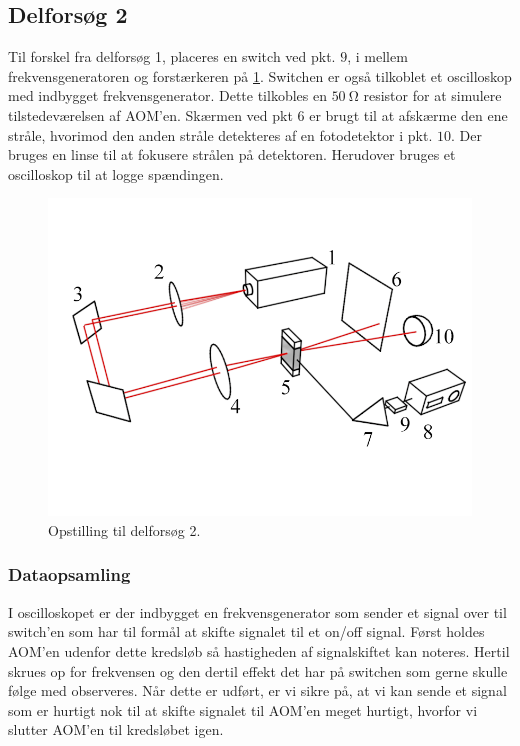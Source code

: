 \documentclass[main]{subfiles}
\begin{document}
\subsection{Delforsøg 2}\label{dataopsamling2}
Til forskel fra delforsøg 1, placeres en switch ved pkt. $9$, i mellem frekvensgeneratoren og forstærkeren på \cref{fig:opstilling2}. Switchen er også tilkoblet et oscilloskop med indbygget frekvensgenerator. Dette tilkobles en $\SI{50}{\ohm}$ resistor for at simulere tilstedeværelsen af AOM'en. Skærmen ved pkt $6$ er brugt til at afskærme den ene stråle, hvorimod den anden stråle detekteres af en fotodetektor i pkt. $10$. Der bruges en linse til at fokusere strålen på detektoren. Herudover bruges et oscilloskop til at logge spændingen.

\begin{figure}[H]
    \centering
    \includegraphics[width=\linewidth]{tegninger/tegning2.png}
    \caption{Opstilling til delforsøg 2.}
    \label{fig:opstilling2}
\end{figure}

\subsubsection{Dataopsamling}
I oscilloskopet er der indbygget en frekvensgenerator som sender et signal over til switch'en som har til formål at skifte signalet til et on/off signal. Først holdes AOM'en udenfor dette kredsløb så hastigheden af signalskiftet kan noteres. Hertil skrues op for frekvensen og den dertil effekt det har på switchen  som gerne skulle følge med observeres. Når dette er udført, er vi sikre på, at vi kan sende et signal som er hurtigt nok til at skifte signalet til AOM'en meget hurtigt, hvorfor vi slutter AOM'en til kredsløbet igen.
\end{document}
